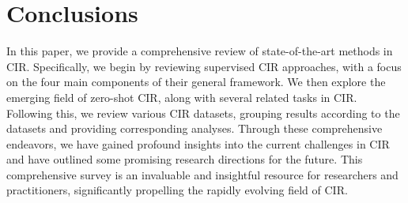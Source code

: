 \section{Conclusions}
\label{sec:concl}
In this paper, we provide a comprehensive review of state-of-the-art methods in CIR. Specifically, we begin by reviewing supervised CIR approaches, with a focus on the four main components of their general framework. We then explore the emerging field of zero-shot CIR, along with several related tasks in CIR. Following this, we review various CIR datasets, grouping results according to the datasets and providing corresponding analyses. 
Through these comprehensive endeavors, we have gained profound insights into the current challenges in CIR and have outlined some promising research directions for the future. This comprehensive survey is an invaluable and insightful resource for researchers and practitioners, significantly propelling the rapidly evolving field of CIR.  



